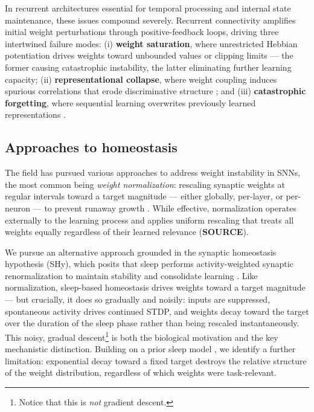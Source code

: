 \documentclass[runningheads]{llncs}
\begin{document}
In recurrent architectures essential for temporal processing and internal state maintenance, these issues compound severely. Recurrent connectivity amplifies initial weight perturbations through positive-feedback loops, driving three intertwined failure modes: (i) \textbf{weight saturation}, where unrestricted Hebbian potentiation drives weights toward unbounded values or clipping limits \cite{gilson_stdp_2010} — the former causing catastrophic instability, the latter eliminating further learning capacity; (ii) \textbf{representational collapse}, where weight coupling induces spurious correlations that erode discriminative structure \cite{akil_synaptic_2020}; and (iii) \textbf{catastrophic forgetting}, where sequential learning overwrites previously learned representations \cite{tadros_sleep-like_2022}. 

\subsection{Approaches to homeostasis}
The field has pursued various approaches to address weight instability in SNNs, the most common being \textit{weight normalization}: rescaling synaptic weights at regular intervals toward a target magnitude — either globally, per-layer, or per-neuron — to prevent runaway growth \cite{carlson_biologically_2013}. While effective, normalization operates externally to the learning process and applies uniform rescaling that treats all weights equally regardless of their learned relevance (\textbf{SOURCE}).

We pursue an alternative approach grounded in the synaptic homeostasis hypothesis (SHy), which posits that sleep performs activity-weighted synaptic renormalization to maintain stability and consolidate learning \cite{tononi_sleep_2014}. Like normalization, sleep-based homeostasis drives weights toward a target magnitude — but crucially, it does so gradually and noisily: inputs are suppressed, spontaneous activity drives continued STDP, and weights decay toward the target over the duration of the sleep phase rather than being rescaled instantaneously. This noisy, gradual descent\footnote{Notice that this is \textit{not} gradient descent.} is both the biological motivation and the key mechanistic distinction. Building on a prior sleep model \cite{massey_sleep-based_2026}, we identify a further limitation: exponential decay toward a fixed target destroys the relative structure of the weight distribution, regardless of which weights were task-relevant.
\end{document}
